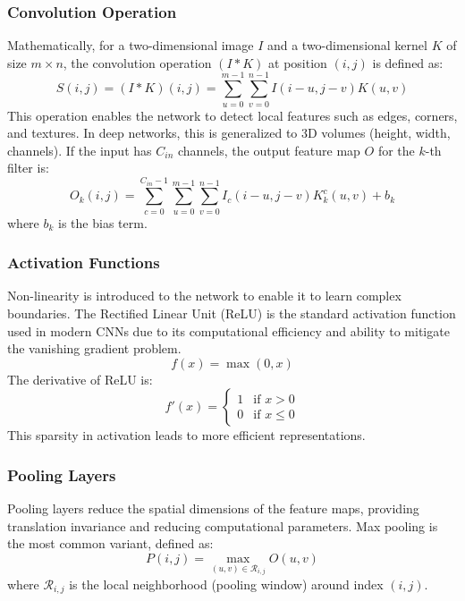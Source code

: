 \documentclass[11pt, a4paper]{article}
\begin{document}
\subsubsection{Convolution Operation}
Mathematically, for a two-dimensional image $I$ and a two-dimensional kernel $K$ of size $m \times n$, the convolution operation $(I * K)$ at position $(i, j)$ is defined as:
\begin{equation}
S(i, j) = (I * K)(i, j) = \sum_{u=0}^{m-1} \sum_{v=0}^{n-1} I(i-u, j-v) K(u, v)
\end{equation}
This operation enables the network to detect local features such as edges, corners, and textures. In deep networks, this is generalized to 3D volumes (height, width, channels). If the input has $C_{in}$ channels, the output feature map $O$ for the $k$-th filter is:
\begin{equation}
O_k(i, j) = \sum_{c=0}^{C_{in}-1} \sum_{u=0}^{m-1} \sum_{v=0}^{n-1} I_c(i-u, j-v) K_k^c(u, v) + b_k
\end{equation}
where $b_k$ is the bias term.

\subsubsection{Activation Functions}
Non-linearity is introduced to the network to enable it to learn complex boundaries. The Rectified Linear Unit (ReLU) is the standard activation function used in modern CNNs due to its computational efficiency and ability to mitigate the vanishing gradient problem.
\begin{equation}
f(x) = \max(0, x)
\end{equation}
The derivative of ReLU is:
\begin{equation}
f'(x) = \begin{cases} 
1 & \text{if } x > 0 \\
0 & \text{if } x \le 0 
\end{cases}
\end{equation}
This sparsity in activation leads to more efficient representations.

\subsubsection{Pooling Layers}
Pooling layers reduce the spatial dimensions of the feature maps, providing translation invariance and reducing computational parameters. Max pooling is the most common variant, defined as:
\begin{equation}
P(i, j) = \max_{(u, v) \in \mathcal{R}_{i,j}} O(u, v)
\end{equation}
where $\mathcal{R}_{i,j}$ is the local neighborhood (pooling window) around index $(i, j)$.
\end{document}
